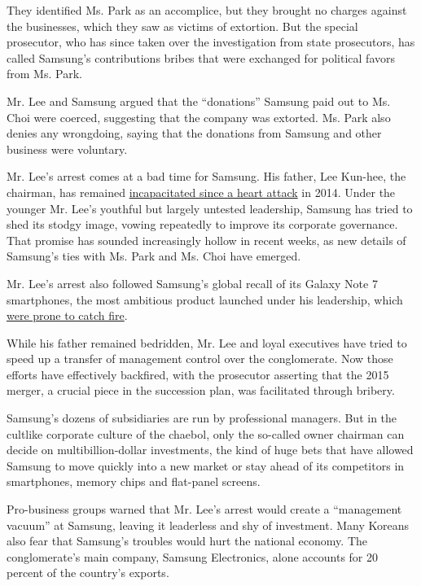 They identified Ms. Park as an accomplice, but they brought no charges
against the businesses, which they saw as victims of extortion. But the
special prosecutor, who has since taken over the investigation from
state prosecutors, has called Samsung's contributions bribes that were
exchanged for political favors from Ms. Park.

Mr. Lee and Samsung argued that the ``donations'' Samsung paid out to
Ms. Choi were coerced, suggesting that the company was extorted. Ms.
Park also denies any wrongdoing, saying that the donations from Samsung
and other business were voluntary.

Mr. Lee's arrest comes at a bad time for Samsung. His father, Lee
Kun-hee, the chairman, has remained
\href{https://www.nytimes3xbfgragh.onion/2014/05/12/business/international/samsungs-chairman-has-surgery-after-heart-attack.html}{incapacitated
since a heart attack} in 2014. Under the younger Mr. Lee's youthful but
largely untested leadership, Samsung has tried to shed its stodgy image,
vowing repeatedly to improve its corporate governance. That promise has
sounded increasingly hollow in recent weeks, as new details of Samsung's
ties with Ms. Park and Ms. Choi have emerged.

Mr. Lee's arrest also followed Samsung's global recall of its Galaxy
Note 7 smartphones, the most ambitious product launched under his
leadership, which
\href{https://www.nytimes3xbfgragh.onion/2016/09/03/business/samsung-galaxy-note-battery.html}{were
prone to catch fire}.

While his father remained bedridden, Mr. Lee and loyal executives have
tried to speed up a transfer of management control over the
conglomerate. Now those efforts have effectively backfired, with the
prosecutor asserting that the 2015 merger, a crucial piece in the
succession plan, was facilitated through bribery.

Samsung's dozens of subsidiaries are run by professional managers. But
in the cultlike corporate culture of the chaebol, only the so-called
owner chairman can decide on multibillion-dollar investments, the kind
of huge bets that have allowed Samsung to move quickly into a new market
or stay ahead of its competitors in smartphones, memory chips and
flat-panel screens.

Pro-business groups warned that Mr. Lee's arrest would create a
``management vacuum'' at Samsung, leaving it leaderless and shy of
investment. Many Koreans also fear that Samsung's troubles would hurt
the national economy. The conglomerate's main company, Samsung
Electronics, alone accounts for 20 percent of the country's exports.

